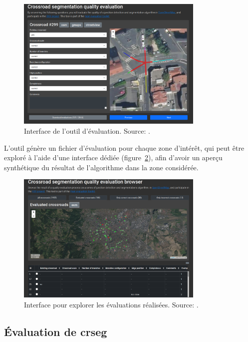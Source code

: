 \begin{figure}[ht]
    \centering
    \includegraphics[width=0.8\textwidth]{images/evaluation/evaluation-xxx.png}
    \caption[Interface de l'outil d'évaluation]{Interface de l'outil d'évaluation. Source: \citep{Favreau2022}.}
    \label{fig:evaluationTool}
\end{figure}

\newpar{}

L'outil génère un fichier d'évaluation pour chaque zone d'intérêt, qui peut être exploré à l'aide d'une interface dédiée (figure~\ref{fig:explorer}), afin d'avoir un aperçu synthétique du résultat de l'algorithme dans la zone considérée.

\begin{figure}[ht]
    \centering
    \includegraphics[width=0.8\textwidth]{images/evaluation/eval-browser-xxx.png}
    \caption[Interface pour explorer les évaluations réalisées]{Interface pour explorer les évaluations réalisées. Source: \citep{Favreau2022}.}
    \label{fig:explorer}
\end{figure}

\subsection{Évaluation de crseg}

